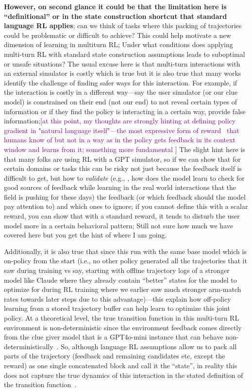 \documentclass[11pt]{article}
\theoremstyle{plain}
\theoremstyle{definition}
\theoremstyle{remark}
\begin{document}
\textbf{However, on second glance it could be that the limitation here is “definitional” or in the state construction shortcut that standard language RL applies}; can we think of tasks where this packing of trajectories could be problematic or difficult to achieve? This could help motivate a new dimension of learning in multiturn RL; Under what conditions does applying multi-turn RL with standard state construction assumptions leads to suboptimal or unsafe situations? The usual excuse here is that multi-turn interactions with an external simulator is costly which is true but it is also true that many works identify the challenge of finding safer ways for this interaction. For example, if the interaction is costly in a different way—say the user simulator (or our clue model) is constrained on their end (not our end) to not reveal certain types of information or if they find the policy is interacting in a certain way, provide false information;[\textcolor{purple}{at this point, my thoughts are strongly hinting at defining policy gradient in "natural language itself"—the most expressive form of reward~\citep{su2026end} that humans know of but not in a way as in the policy gets feedback in its context window and learns from it; something more fundamental }] The slight hint here is that many folks are using RL with a GPT simulator, so if we can show that for certain domains or tasks this can be risky not just because the feedback itself is difficult to get, but how to \textit{validate} (e.g., , how does the model learn to check for good sources of feedback while learning in the real world interactions that the field is pushing for these days) the feedback (or which feedback should the model pay attention to) and which ones to ignore; if you cannot define this with a scalar reward, you can show that with a standard reward, it tends to disturb the user model more in a certain behavioral pattern; Still not sure how much we have covered here but you get the hint of where I am going. 


Additionally, it is also true that since this run with the same base model which is on-policy from the start (i.e., no other policy generated all the trajectories that it saw during training vs say, starting with offline trajectory logs of a stronger model like Claude where they already contain “better” states for the model to optimize for during RL training where we earlier saw much stronger arm-match rates towards later steps due to this advantage)—this explain how off-policy learning from a stored trajectory buffer can help learn to optimize this joint policy. At a theoretical level, the true transition function in this multi-turn RL environment is non-deterministic since the environment feedback comes directly from the clue giver model that is a GPT4o-mini instance that can behave non-deterministically~\citep{gpt4}. So, although language RL assumptions allow us to pack all parts of the trajectory (feedback and remaining candidates etc, except the reward) as one single concatenated block and call it the “state”, in reality this does not capture the true dynamics of this interaction in the stated definition of the transition function~\citep{samineni2026rlonlyanalyzingstructural, kazemnejad2025vinepporefiningcreditassignment}. 
\end{document}
